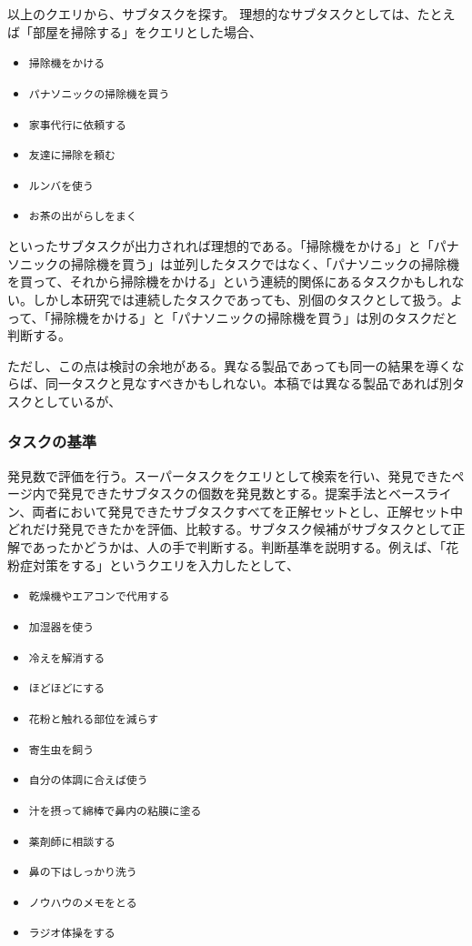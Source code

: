 \documentclass[submit,techreq]{ipsj}
\def\|{\verb|}
\begin{document}
以上のクエリから、サブタスクを探す。
理想的なサブタスクとしては、たとえば「部屋を掃除する」をクエリとした場合、

\begin{itemize}
\item \|掃除機をかける|
\item \|パナソニックの掃除機を買う|
\item \|家事代行に依頼する|
\item \|友達に掃除を頼む|
\item \|ルンバを使う|
\item \|お茶の出がらしをまく|
\end{itemize}

といったサブタスクが出力されれば理想的である。「掃除機をかける」と「パナソニックの掃除機を買う」は並列したタスクではなく、「パナソニックの掃除機を買って、それから掃除機をかける」という連続的関係にあるタスクかもしれない。しかし本研究では連続したタスクであっても、別個のタスクとして扱う。よって、「掃除機をかける」と「パナソニックの掃除機を買う」は別のタスクだと判断する。

ただし、この点は検討の余地がある。異なる製品であっても同一の結果を導くならば、同一タスクと見なすべきかもしれない。本稿では異なる製品であれば別タスクとしているが、


\subsubsection{タスクの基準}
\label{sec: evaluate}
発見数で評価を行う。スーパータスクをクエリとして検索を行い、発見できたページ内で発見できたサブタスクの個数を発見数とする。提案手法とベースライン、両者において発見できたサブタスクすべてを正解セットとし、正解セット中どれだけ発見できたかを評価、比較する。サブタスク候補がサブタスクとして正解であったかどうかは、人の手で判断する。判断基準を説明する。例えば、「花粉症対策をする」というクエリを入力したとして、

\begin{itemize}
\item \|乾燥機やエアコンで代用する|
\item \|加湿器を使う|
\item \|冷えを解消する|
\item \|ほどほどにする|
\item \|花粉と触れる部位を減らす|
\item \|寄生虫を飼う|
\item \|自分の体調に合えば使う|
\item \|汁を摂って綿棒で鼻内の粘膜に塗る|
\item \|薬剤師に相談する|
\item \|鼻の下はしっかり洗う|
\item \|ノウハウのメモをとる|
\item \|ラジオ体操をする|
\end{itemize}
\end{document}
